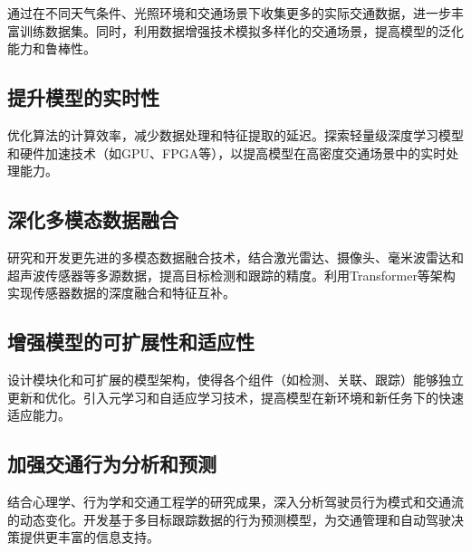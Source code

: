 通过在不同天气条件、光照环境和交通场景下收集更多的实际交通数据，进一步丰富训练数据集。同时，利用数据增强技术模拟多样化的交通场景，提高模型的泛化能力和鲁棒性\cite{tran2021video}。



\subsection{提升模型的实时性}



优化算法的计算效率，减少数据处理和特征提取的延迟。探索轻量级深度学习模型和硬件加速技术（如GPU、FPGA等），以提高模型在高密度交通场景中的实时处理能力\cite{huang2020graph}。





\subsection{深化多模态数据融合}


研究和开发更先进的多模态数据融合技术，结合激光雷达、摄像头、毫米波雷达和超声波传感器等多源数据，提高目标检测和跟踪的精度。利用Transformer等架构实现传感器数据的深度融合和特征互补\cite{tang2021quasi}。









\subsection{增强模型的可扩展性和适应性}



设计模块化和可扩展的模型架构，使得各个组件（如检测、关联、跟踪）能够独立更新和优化。引入元学习和自适应学习技术，提高模型在新环境和新任务下的快速适应能力。\cite{li2020multiple}







\subsection{加强交通行为分析和预测}

结合心理学、行为学和交通工程学的研究成果，深入分析驾驶员行为模式和交通流的动态变化。开发基于多目标跟踪数据的行为预测模型，为交通管理和自动驾驶决策提供更丰富的信息支持\cite{yan2021trans}。



